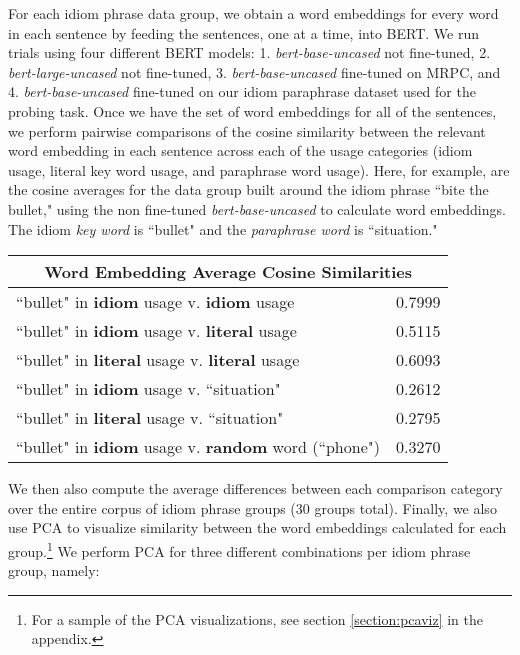 \documentclass[11pt,a4paper]{article}
\begin{document}
For each idiom phrase data group, we obtain a word embeddings for every word in each sentence by feeding the sentences, one at a time, into BERT. We run trials using four different BERT models: 1. \textit{bert-base-uncased} not fine-tuned, 2. \textit{bert-large-uncased} not fine-tuned, 3. \textit{bert-base-uncased} fine-tuned on MRPC, and 4. \textit{bert-base-uncased} fine-tuned on our idiom paraphrase dataset used for the probing task. Once we have the set of word embeddings for all of the sentences, we perform pairwise comparisons of the cosine similarity between the relevant word embedding in each sentence across each of the usage categories (idiom usage, literal key word usage, and paraphrase word usage). Here, for example, are the cosine averages for the data group built around the idiom phrase ``bite the bullet," using the non fine-tuned \textit{bert-base-uncased} to calculate word embeddings. The idiom \textit{key word} is ``bullet" and the \textit{paraphrase word} is ``situation."

\vspace{2mm}
\noindent
\begin{small}
\begin{tabular}{ |p{5.9cm}|p{1cm}|  }
\hline
\multicolumn{2}{|c|}{Word Embedding Average Cosine Similarities } \\
\hline
``bullet" in \textbf{idiom} usage v. \textbf{idiom} usage & 0.7999 \\
\hline
``bullet" in \textbf{idiom} usage v. \textbf{literal} usage & 0.5115 \\
\hline
``bullet" in \textbf{literal} usage v. \textbf{literal} usage & 0.6093 \\
\hline
``bullet" in \textbf{idiom} usage v.  ``situation" & 0.2612 \\
\hline
``bullet" in \textbf{literal} usage v. ``situation" & 0.2795 \\
\hline
``bullet" in \textbf{idiom} usage v. \textbf{random} word (``phone") & 0.3270 \\
\hline
\end{tabular}
\end{small}
We then also compute the average differences between each comparison category over the entire corpus of idiom phrase groups (30 groups total). Finally, we also use PCA to visualize similarity between the word embeddings calculated for each group.\footnote{For a sample of the PCA visualizations, see section \ref{section:pcaviz} in the appendix.} We perform PCA for three different combinations per idiom phrase group, namely:
\end{document}
